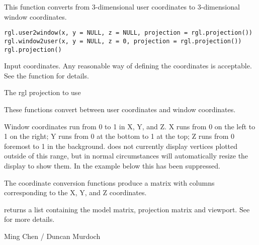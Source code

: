 \begin{Description}\relax
This function converts from 3-dimensional user coordinates
to 3-dimensional window coordinates.
\end{Description}
\begin{Usage}
\begin{verbatim}
rgl.user2window(x, y = NULL, z = NULL, projection = rgl.projection())
rgl.window2user(x, y = NULL, z = 0, projection = rgl.projection())
rgl.projection()
\end{verbatim}
\end{Usage}
\begin{Arguments}
\begin{ldescription}
\item[\code{x, y, z}] Input coordinates.  Any reasonable way of defining the
coordinates is acceptable.  See the function 
for details.
\item[\code{projection}] The rgl projection to use 
\end{ldescription}
\end{Arguments}
\begin{Details}\relax
These functions convert between user coordinates and window coordinates.

Window coordinates run from 0 to 1 in X, Y, and Z.  X runs from 0 on the
left to 1 on the right; Y runs from 0 at the bottom to 1 at the top;
Z runs from 0 foremost to 1 in the background.   does not currently
display vertices plotted outside of this range, but in normal circumstances will automatically resize the
display to show them.  In the example below this has been suppressed.
\end{Details}
\begin{Value}
The coordinate conversion functions produce a matrix with columns corresponding 
to the X, Y, and Z coordinates.

 returns a list containing the model matrix, projection matrix
and viewport.  See  for more details.
\end{Value}
\begin{Author}\relax
Ming Chen / Duncan Murdoch
\end{Author}
\begin{SeeAlso}\relax
{}
\end{SeeAlso}
\begin{Examples}
\end{Examples}


